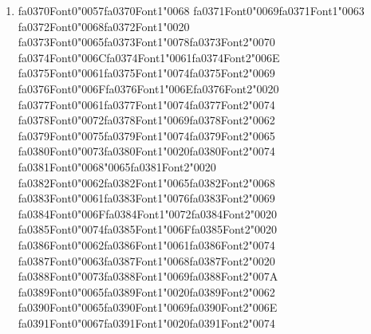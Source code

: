 \documentclass[12pt]{article}
\begin{document}
\begin{enumerate}[label=Q\arabic*.]
 \begin{enumerate}[label=(\Alph*)]
     \item Lower perplexity always indicates overfitting to training data
     \item Perplexity ignores normalization across token positions
     \item Question answering requires larger vocabularies than modeling
     \item Perplexity reflects intrinsic likelihood rather than task utility
 \end{enumerate}
 
 \item {\csname fa0370Font0\endcsname\char"0057}{\csname fa0370Font1\endcsname\char"0068} {\csname fa0371Font0\endcsname\char"0069}{\csname fa0371Font1\endcsname\char"0063} {\csname fa0372Font0\endcsname\char"0068}{\csname fa0372Font1\endcsname\char"0020} {\csname fa0373Font0\endcsname\char"0065}{\csname fa0373Font1\endcsname\char"0078}{\csname fa0373Font2\endcsname\char"0070} {\csname fa0374Font0\endcsname\char"006C}{\csname fa0374Font1\endcsname\char"0061}{\csname fa0374Font2\endcsname\char"006E} {\csname fa0375Font0\endcsname\char"0061}{\csname fa0375Font1\endcsname\char"0074}{\csname fa0375Font2\endcsname\char"0069} {\csname fa0376Font0\endcsname\char"006F}{\csname fa0376Font1\endcsname\char"006E}{\csname fa0376Font2\endcsname\char"0020} {\csname fa0377Font0\endcsname\char"0061}{\csname fa0377Font1\endcsname\char"0074}{\csname fa0377Font2\endcsname\char"0074} {\csname fa0378Font0\endcsname\char"0072}{\csname fa0378Font1\endcsname\char"0069}{\csname fa0378Font2\endcsname\char"0062} {\csname fa0379Font0\endcsname\char"0075}{\csname fa0379Font1\endcsname\char"0074}{\csname fa0379Font2\endcsname\char"0065} {\csname fa0380Font0\endcsname\char"0073}{\csname fa0380Font1\endcsname\char"0020}{\csname fa0380Font2\endcsname\char"0074} {\csname fa0381Font0\endcsname\char"0068}{\char"0065}{\csname fa0381Font2\endcsname\char"0020} {\csname fa0382Font0\endcsname\char"0062}{\csname fa0382Font1\endcsname\char"0065}{\csname fa0382Font2\endcsname\char"0068} {\csname fa0383Font0\endcsname\char"0061}{\csname fa0383Font1\endcsname\char"0076}{\csname fa0383Font2\endcsname\char"0069} {\csname fa0384Font0\endcsname\char"006F}{\csname fa0384Font1\endcsname\char"0072}{\csname fa0384Font2\endcsname\char"0020} {\csname fa0385Font0\endcsname\char"0074}{\csname fa0385Font1\endcsname\char"006F}{\csname fa0385Font2\endcsname\char"0020} {\csname fa0386Font0\endcsname\char"0062}{\csname fa0386Font1\endcsname\char"0061}{\csname fa0386Font2\endcsname\char"0074} {\csname fa0387Font0\endcsname\char"0063}{\csname fa0387Font1\endcsname\char"0068}{\csname fa0387Font2\endcsname\char"0020} {\csname fa0388Font0\endcsname\char"0073}{\csname fa0388Font1\endcsname\char"0069}{\csname fa0388Font2\endcsname\char"007A} {\csname fa0389Font0\endcsname\char"0065}{\csname fa0389Font1\endcsname\char"0020}{\csname fa0389Font2\endcsname\char"0062} {\csname fa0390Font0\endcsname\char"0065}{\csname fa0390Font1\endcsname\char"0069}{\csname fa0390Font2\endcsname\char"006E} {\csname fa0391Font0\endcsname\char"0067}{\csname fa0391Font1\endcsname\char"0020}{\csname fa0391Font2\endcsname\char"0074} 
\end{enumerate}
\end{document}
